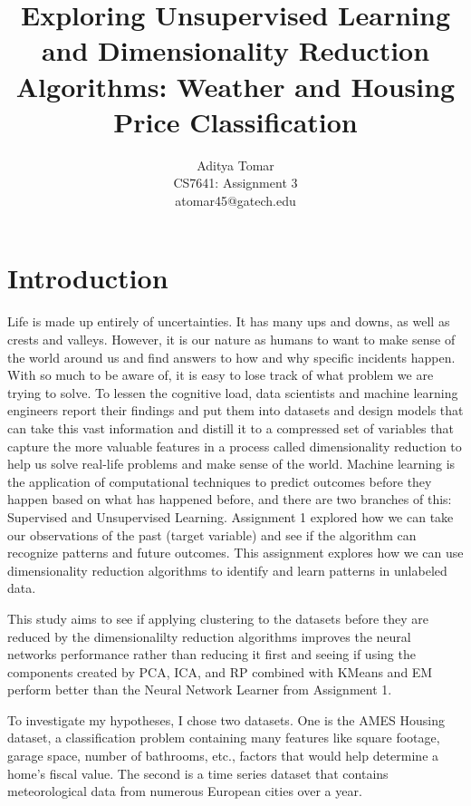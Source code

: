 \documentclass[conference]{IEEEtran}
\title{Exploring Unsupervised Learning and Dimensionality Reduction Algorithms: Weather and Housing Price Classification}
\author{Aditya Tomar \\ CS7641: Assignment 3 \\ atomar45@gatech.edu}
\begin{document}
\maketitle

\section{Introduction} Life is made up entirely of uncertainties. It has many ups and downs, as well as crests and valleys. However, it is our nature as humans to want to make sense of the world around us and find answers to how and why specific incidents happen. With so much to be aware of, it is easy to lose track of what problem we are trying to solve. To lessen the cognitive load, data scientists and machine learning engineers report their findings and put them into datasets and design models that can take this vast information and distill it to a compressed set of variables that capture the more valuable features in a process called dimensionality reduction to help us solve real-life problems and make sense of the world. Machine learning is the application of computational techniques to predict outcomes before they happen based on what has happened before, and there are two branches of this: Supervised and Unsupervised Learning. Assignment 1 explored how we can take our observations of the past (target variable) and see if the algorithm can recognize patterns and future outcomes. This assignment explores how we can use dimensionality reduction algorithms to identify and learn patterns in unlabeled data. 
\par This study aims to see if applying clustering to the datasets before they are reduced by the dimensionalilty reduction algorithms improves the neural networks performance rather than reducing it first and seeing if using the components created by PCA, ICA, and RP combined with KMeans and EM perform better than the Neural Network Learner from Assignment 1.
\par To investigate my hypotheses, I chose two datasets. One is the AMES Housing dataset, a classification problem containing many features like square footage, garage space, number of bathrooms, etc., factors that would help determine a home's fiscal value. The second is a time series dataset that contains meteorological data from numerous European cities over a year. 
\end{document}
